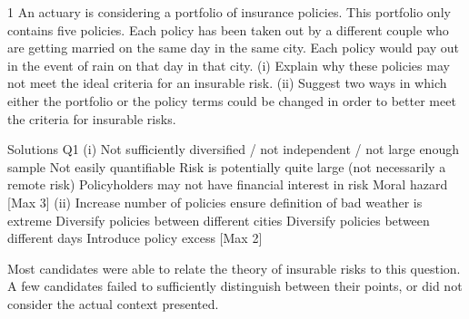 \documentclass[a4paper,12pt]{article}
\begin{document}
1 An actuary is considering a portfolio of insurance policies. This portfolio only contains five policies. Each policy has been taken out by a different couple who are getting married on the same day in the same city. Each policy would pay out in the
event of rain on that day in that city.
(i) Explain why these policies may not meet the ideal criteria for an insurable risk. 
(ii) Suggest two ways in which either the portfolio or the policy terms could be changed in order to better meet the criteria for insurable risks. 

\newpage
Solutions
Q1 (i) Not sufficiently diversified / not independent / not large enough sample 
Not easily quantifiable 
Risk is potentially quite large (not necessarily a remote risk) 
Policyholders may not have financial interest in risk 
Moral hazard 
[Max 3]
(ii) Increase number of policies 
ensure definition of bad weather is extreme 
Diversify policies between different cities 
Diversify policies between different days 
Introduce policy excess 
[Max 2]

Most candidates were able to relate the theory of insurable risks to this question. A few candidates failed to sufficiently distinguish between their points, or did not consider the actual context presented.
\end{document}
